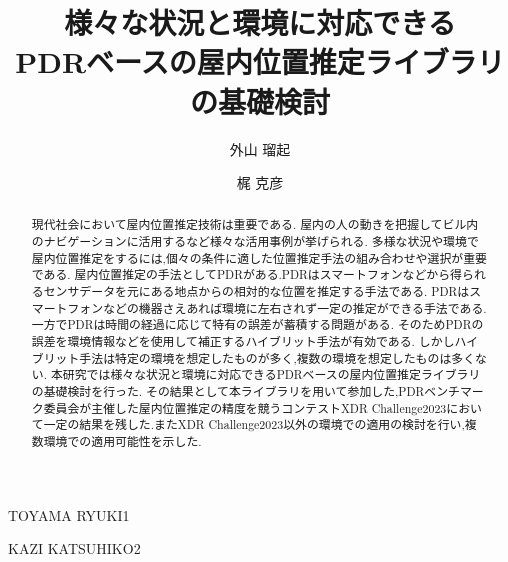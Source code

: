 \documentclass[Japanese]{dicomopapers}
\begin{document}
\title{様々な状況と環境に対応できる\\PDRベースの屋内位置推定ライブラリの基礎検討}



\author{外山 瑠起}{TOYAMA RYUKI}{1}
\author{梶 克彦}{KAZI KATSUHIKO}{2}



\begin{abstract}
	現代社会において屋内位置推定技術は重要である.
	屋内の人の動きを把握してビル内のナビゲーションに活用するなど様々な活用事例が挙げられる.
	多様な状況や環境で屋内位置推定をするには,個々の条件に適した位置推定手法の組み合わせや選択が重要である.
	屋内位置推定の手法としてPDRがある.PDRはスマートフォンなどから得られるセンサデータを元にある地点からの相対的な位置を推定する手法である.
	PDRはスマートフォンなどの機器さえあれば環境に左右されず一定の推定ができる手法である.
	一方でPDRは時間の経過に応じて特有の誤差が蓄積する問題がある.
	そのためPDRの誤差を環境情報などを使用して補正するハイブリット手法が有効である.
	しかしハイブリット手法は特定の環境を想定したものが多く,複数の環境を想定したものは多くない.
	本研究では様々な状況と環境に対応できるPDRベースの屋内位置推定ライブラリの基礎検討を行った.
	その結果として本ライブラリを用いて参加した,PDRベンチマーク委員会が主催した屋内位置推定の精度を競うコンテストXDR Challenge2023において一定の結果を残した.またXDR Challenge2023以外の環境での適用の検討を行い,複数環境での適用可能性を示した.

\end{abstract}

\maketitle




















\end{document}
